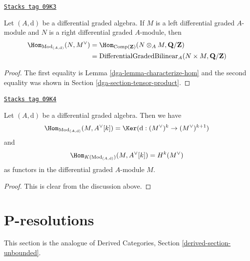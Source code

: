 \begin{lemma}
\label{dga-lemma-map-into-dual}
\href{https://stacks.math.columbia.edu/tag/09K3}{\texttt{Stacks tag 09K3}}

Let $(A, \text{d})$ be a differential graded algebra. If
$M$ is a left differential graded $A$-module and $N$ is a
right differential graded $A$-module, then
\begin{align*}
\Hom_{\text{Mod}_{(A, \text{d})}}(N, M^\vee)
& =
\Hom_{\text{Comp}(\mathbf{Z})}(N \otimes_A M, \mathbf{Q}/\mathbf{Z}) \\
& =
\text{DifferentialGradedBilinear}_A(N \times M, \mathbf{Q}/\mathbf{Z})
\end{align*}
\end{lemma}

\begin{proof}

The first equality is Lemma \ref{dga-lemma-characterize-hom}
and the second equality was shown in Section \ref{dga-section-tensor-product}.
\end{proof}

\begin{lemma}
\label{dga-lemma-hom-into-shift-dual-free}
\href{https://stacks.math.columbia.edu/tag/09K4}{\texttt{Stacks tag 09K4}}

Let $(A, \text{d})$ be a differential graded algebra. Then we have
$$
\Hom_{\text{Mod}_{(A, \text{d})}}(M, A^\vee[k]) =
\Ker(\text{d} : (M^\vee)^k \to (M^\vee)^{k + 1})
$$
and
$$
\Hom_{K(\text{Mod}_{(A, \text{d})})}(M, A^\vee[k]) = H^k(M^\vee)
$$
as functors in the differential graded $A$-module $M$.
\end{lemma}

\begin{proof}
This is clear from the discussion above.
\end{proof}

\section{P-resolutions}
\label{dga-section-P-resolutions}
This section is the analogue of
Derived Categories, Section \ref{derived-section-unbounded}.

